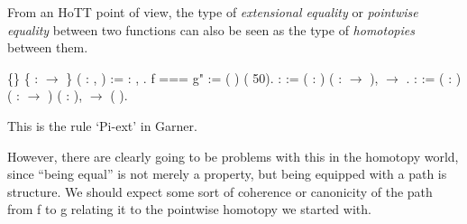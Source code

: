 \documentclass[12pt]{report}
\begin{document}
   From an HoTT point of view, the type of \textit{extensional equality} or \textit{pointwise equality} between two functions can also be seen as the type of \textit{homotopies} between them. \begin{coqdoccode}
\coqdocemptyline
\coqdocnoindent
{}  \{\} \{ :  \ensuremath{\rightarrow} \} (  : \coqdockw{\ensuremath{\forall}} ,  )\coqdoceol
\coqdocindent{1.00em}
:= \coqdockw{\ensuremath{\forall}}  : ,     .\coqdoceol
\coqdocemptyline
\coqdocnoindent
{}f === g" := (  ) (  50).\coqdoceol
\coqdocemptyline
\coqdocnoindent
{}  :  :=\coqdoceol
\coqdocindent{1.00em}
\coqdockw{\ensuremath{\forall}} (  : ) ( :  \ensuremath{\rightarrow} ),    \ensuremath{\rightarrow}   .\coqdoceol
\coqdocemptyline
\coqdocnoindent
{}  :  :=\coqdoceol
\coqdocindent{1.00em}
\coqdockw{\ensuremath{\forall}} ( : ) ( :  \ensuremath{\rightarrow} ) (  :  ),    \ensuremath{\rightarrow} (  ).\coqdoceol
\end{coqdoccode}
This is the rule ‘Pi-ext’ in Garner. \begin{coqdoccode}
\coqdocemptyline
\end{coqdoccode}
However, there are clearly going to be problems with this in the
   homotopy world, since “being equal” is not merely a property, but
   being equipped with a path is structure.  We should expect some
   sort of coherence or canonicity of the path from f to g relating it
   to the pointwise homotopy we started with.  
\end{document}
